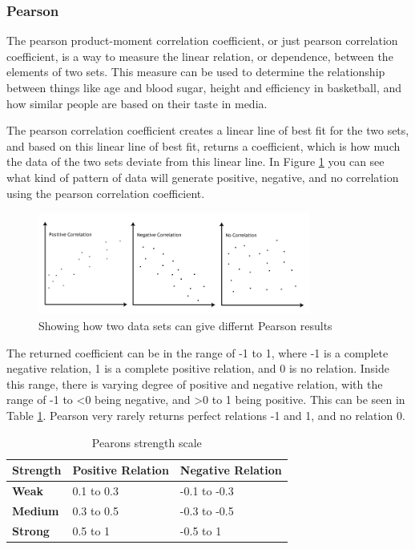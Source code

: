 \subsubsection{Pearson}

The pearson product-moment correlation coefficient, or just pearson correlation coefficient, is a way to measure the linear relation, or dependence, between the elements of two sets. This measure can be used to determine the relationship between things like age and blood sugar, height and efficiency in basketball, and how similar people are based on their taste in media. \cite{Pearson2}

The pearson correlation coefficient creates a linear line of best fit for the two sets, and based on this linear line of best fit, returns a coefficient, which is how much the data of the two sets deviate from this linear line. In Figure \ref{Pearson2} you can see what kind of pattern of data will generate positive, negative, and no correlation using the pearson correlation coefficient. \cite{Pearson2}

\begin{figure}[htb]
\centering
\includegraphics[width=0.8\textwidth]{Images/pearson2.png}
\caption{Showing how two data sets can give differnt Pearson results}
\label{Pearson2}
\end{figure}

The returned coefficient can be in the range of -1 to 1, where -1 is a complete negative relation, 1 is a complete positive relation, and 0 is no relation. Inside this range, there is varying degree of positive and negative relation, with the range of -1 to <0 being negative, and >0 to 1 being positive. This can be seen in Table \ref{PearsonStr}. Pearson very rarely returns perfect relations -1 and 1, and no relation 0. \cite{Pearson2}

\begin{table}[htb]
\centering
\begin{tabular}{|l|l|l|} \hline
	\textbf{Strength} & \textbf{Positive Relation} & \textbf{Negative Relation} \\ \hline
	\textbf{Weak} & 0.1 to 0.3 & -0.1 to -0.3 \\ \hline
	\textbf{Medium} & 0.3 to 0.5 & -0.3 to -0.5 \\ \hline
	\textbf{Strong} & 0.5 to 1 & -0.5 to 1 \\ \hline
\end{tabular}
\caption{Pearons strength scale}
\label{PearsonStr}
\end{table}

